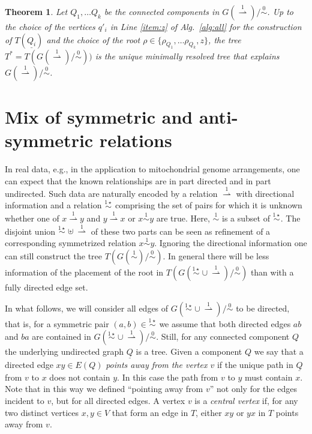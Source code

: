 \documentclass[smallextended]{svjour3}
\newcommand{\rev}[1]{\begingroup\color{blue}#1\endgroup}
\newcommand{\Ro}{\mathrel{\overset{0}{\sim}}}
\newcommand{\Rl}{\mathrel{\overset{1}{\sim}}}
\newcommand{\Rlstar}{\mathrel{\overset{1\star}{\sim}}}
\newcommand{\Rld}{\mathrel{\overset{1}{\rightharpoonup}}}
\newtheorem{thm}{Theorem}
\begin{document}
\begin{thm}
  Let $Q_1,\dots Q_k$ be the connected components in $G(\Rld)/\Ro$. 
 Up to
  the choice of the vertices $q'_i$ in Line \ref{item:z} of Alg.\
  \ref{alg:all} for the construction of $T(\underline{Q_i})$ and the choice
  of the root $\rho\in \{\rho_{Q_1},\ldots \rho_{Q_k}, z\}$, the tree $T^*
  = T(G(\Rld)/\Ro))$ is the unique \rev{minimally} resolved tree that explains
  $G(\Rld)/\Ro$.
  \label{thm:star-tree-dir}
\end{thm}

\section{Mix of symmetric and anti-symmetric relations}
\label{sect:mixed}

In real data, e.g., in the application to mitochondrial genome
arrangements, one can expect that the known relationships are in part
directed and in part undirected. Such data are naturally encoded by a
relation $\Rld$ with directional information and a relation $\Rlstar$
comprising the set of pairs for which it is unknown whether \rev{ one of $x\Rld y$ and
$y\Rld x$ or $x\Rl y$ are true. Here, $\Rl$ is a subset of $\Rlstar$.}
The
disjoint union $\Rlstar\uplus\Rld$ of these two parts can be seen as
refinement of a corresponding symmetrized relation $x\Rl y$.  Ignoring the
directional information one can still construct the tree $T(G(\Rl)/\Ro)$.
In general there will be less information of the placement of the root in
$T(G(\Rlstar\cup\Rld)/\Ro)$ than with a fully directed edge set. 

\rev{In what follows, we will consider all edges of $G(\Rlstar\cup\Rld)/\Ro$ 
to be directed, that is, for a symmetric pair $(a,b)\in\Rlstar$ we assume that 
both directed edges $ab$ and $ba$ are contained in $G(\Rlstar\cup\Rld)/\Ro$.
Still, for any connected component $Q$ the underlying undirected graph
$\underline{Q}$ is a tree. 
}
Given a component $Q$ we say that a directed edge $xy \in E(Q)$ \emph{points
 away from the vertex $v$} if the unique  path in $\underline{Q}$ from $v$ to $x$ does
not contain $y$. In this case the path from $v$ to $y$ must contain $x$.  Note
that in this way we defined ``pointing away from $v$'' not only for the
edges incident to $v$, but for all directed edges. 
A vertex $v$ is a \emph{central vertex} if, for any two distinct
vertices $x,y\in V$ that form an edge in $T$, either $xy$ or $yx$ in $T$
points away from $v$.
\end{document}
